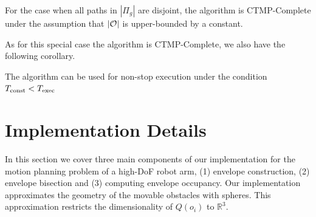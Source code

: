\documentclass[a4paper]{report}
\begin{document}
\vspace{2mm}
\begin{theorem}
	For the case when all paths in $|\Pi_g|$ are disjoint, the algorithm is CTMP-Complete under the assumption that $|\mathcal{O}|$ is upper-bounded by a constant.
\end{theorem}

As for this special case the algorithm is CTMP-Complete, we also have the following corollary.

\vspace{2mm}
\begin{cor}
	The algorithm can be used for non-stop execution under the condition~$T_{\textrm{const}} < T_{\textrm{exec}}$
\end{cor}

\section{Implementation Details} %
In this section we cover three main components of our implementation for the motion planning problem of a high-DoF robot arm, (1) envelope construction, (2) envelope bisection and (3) computing envelope occupancy.
%
Our implementation approximates the geometry of the movable obstacles with spheres. This approximation restricts the dimensionality of $Q(o_i)$ to $\mathbb{R}^3$.
\end{document}

